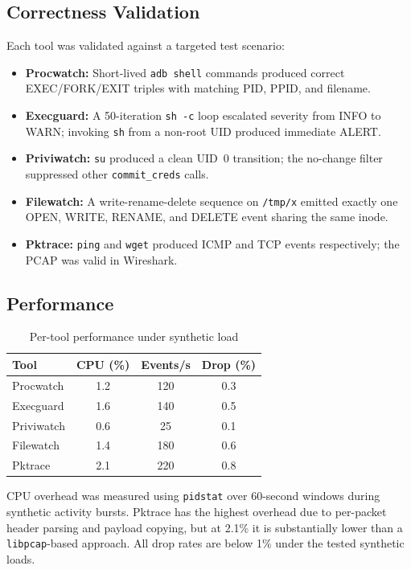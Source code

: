 \documentclass[conference]{IEEEtran}
\begin{document}
\subsection{Correctness Validation}
Each tool was validated against a targeted test scenario:
\begin{itemize}
  \item \textbf{Procwatch:} Short-lived \texttt{adb shell} commands produced correct EXEC/FORK/EXIT triples with matching PID, PPID, and filename.
  \item \textbf{Execguard:} A 50-iteration \texttt{sh -c} loop escalated severity from INFO to WARN; invoking \texttt{sh} from a non-root UID produced immediate ALERT.
  \item \textbf{Priviwatch:} \texttt{su} produced a clean UID~0 transition; the no-change filter suppressed other \texttt{commit\_creds} calls.
  \item \textbf{Filewatch:} A write-rename-delete sequence on \texttt{/tmp/x} emitted exactly one OPEN, WRITE, RENAME, and DELETE event sharing the same inode.
  \item \textbf{Pktrace:} \texttt{ping} and \texttt{wget} produced ICMP and TCP events respectively; the PCAP was valid in Wireshark.
\end{itemize}

\subsection{Performance}

\begin{table}[H]
  \centering
  \caption{Per-tool performance under synthetic load}
  \label{tab:perf}
  \begin{tabular}{|l|c|c|c|}
    \hline
    \textbf{Tool} & \textbf{CPU (\%)} & \textbf{Events/s} & \textbf{Drop (\%)} \\ \hline
    Procwatch  & 1.2 & 120 & 0.3 \\ \hline
    Execguard  & 1.6 & 140 & 0.5 \\ \hline
    Priviwatch & 0.6 &  25 & 0.1 \\ \hline
    Filewatch  & 1.4 & 180 & 0.6 \\ \hline
    Pktrace    & 2.1 & 220 & 0.8 \\ \hline
  \end{tabular}
\end{table}

CPU overhead was measured using \texttt{pidstat} over 60-second windows during synthetic activity bursts. Pktrace has the highest overhead due to per-packet header parsing and payload copying, but at 2.1\% it is substantially lower than a \texttt{libpcap}-based approach. All drop rates are below 1\% under the tested synthetic loads.
\end{document}
